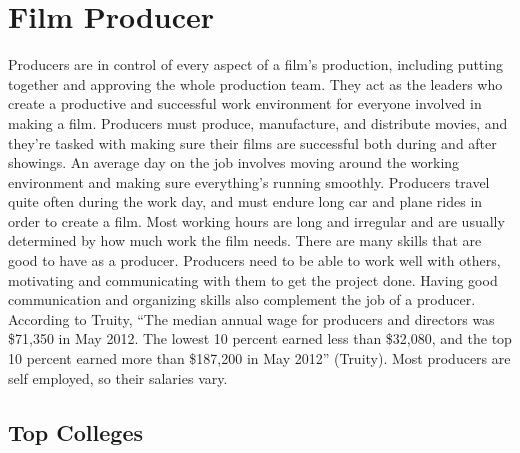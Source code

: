 \chapter{Film Producer}
\begin{multicols}{2}

Producers are in control of every aspect of a film’s production, including putting together and approving the whole production team. They act as the leaders who create a productive and successful work environment for everyone involved in making a film. Producers must produce, manufacture, and distribute movies, and they’re tasked with making sure their films are successful both during and after showings. An average day on the job involves moving around the working environment and making sure everything's running smoothly. Producers travel quite often during the work day, and must endure long car and plane rides in order to create a film. Most working hours are long and irregular and are usually determined by how much work the film needs. There are many skills that are good to have as a producer. Producers need to be able to work well with others, motivating and communicating with them to get the project done. Having good communication and organizing skills also complement the job of a producer. According to Truity, “The median annual wage for producers and directors was \$71,350 in May 2012. The lowest 10 percent earned less than \$32,080, and the top 10 percent earned more than \$187,200 in May 2012” (Truity). Most producers are self employed, so their salaries vary.

\end{multicols}

\section{Top Colleges}

\begin{table}[H]
\centering
\caption{Undergraduate Colleges}
\label{Film Producer Undergraduate Colleges}
\end{table}


